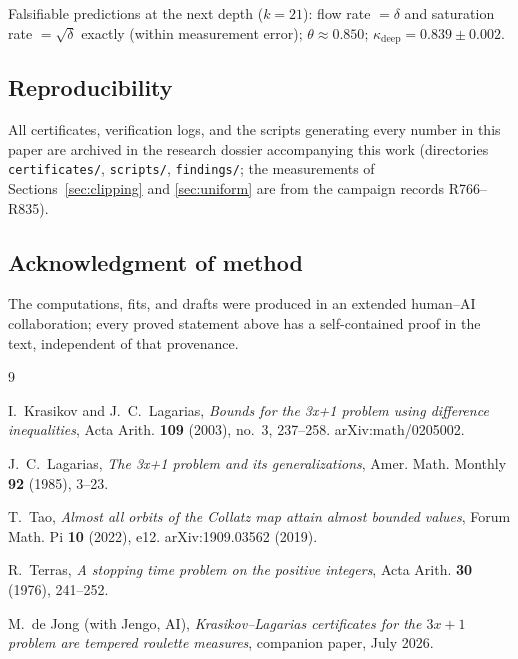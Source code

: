 \documentclass[11pt]{article}
\theoremstyle{definition}
\theoremstyle{remark}
\newcommand{\kap}{\kappa}
\begin{document}
Falsifiable predictions at the next depth ($k = 21$): flow rate
$= \delta$ and saturation rate $= \sqrt{\delta}$ exactly (within
measurement error); $\theta \approx 0.850$; $\kap_{\mathrm{deep}} =
0.839 \pm 0.002$.

\subsection*{Reproducibility}
All certificates, verification logs, and the scripts generating every
number in this paper are archived in the research dossier accompanying
this work (directories \texttt{certificates/}, \texttt{scripts/},
\texttt{findings/}; the measurements of Sections~\ref{sec:clipping} and
\ref{sec:uniform} are from the campaign records R766--R835).

\subsection*{Acknowledgment of method}
The computations, fits, and drafts were produced in an extended human--AI
collaboration; every proved statement above has a self-contained proof in
the text, independent of that provenance.

\begin{thebibliography}{9}

I.~Krasikov and J.~C.~Lagarias,
\emph{Bounds for the 3x+1 problem using difference inequalities},
Acta Arith. \textbf{109} (2003), no.~3, 237--258.
arXiv:math/0205002.

J.~C.~Lagarias,
\emph{The 3x+1 problem and its generalizations},
Amer. Math. Monthly \textbf{92} (1985), 3--23.

T.~Tao,
\emph{Almost all orbits of the Collatz map attain almost bounded values},
Forum Math. Pi \textbf{10} (2022), e12.
arXiv:1909.03562 (2019).

R.~Terras,
\emph{A stopping time problem on the positive integers},
Acta Arith. \textbf{30} (1976), 241--252.

M.~de Jong (with Jengo, AI),
\emph{Krasikov--Lagarias certificates for the $3x+1$ problem are tempered
roulette measures},
companion paper, July 2026.

\end{thebibliography}
\end{document}
